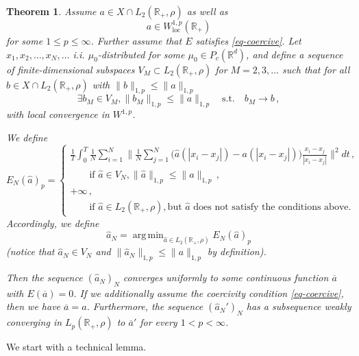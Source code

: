 \documentclass[A4paper,11pt]{article}
\newtheorem{theorem}{Theorem}[section]
\theoremstyle{definition}
\newcommand{\R}{\mathbb{R}}
\DeclareMathOperator{\argmin}{arg\,min}
\begin{document}
\begin{theorem}\label{thm}
	Assume $a\in X\cap L_2(\R_+,\rho)$ as well as
	\begin{equation}\label{eq-a-bounded}
		a\in W^{1,p}_{\text{loc}}(\R_+)
	\end{equation}
	for some $1\leq p\leq\infty$.
	Further assume that $E$ satisfies \eqref{eq-coercive}. Let $x_1,x_2,\ldots,x_N,\ldots$ i.i. $\mu_0$-distributed for
	some $\mu_0\in P_c(\R^d)$, and define a sequence of finite-dimensional subspaces $V_M\subset L_2(\R_+,\rho)$
	for $M=2,3,\ldots$ such that for all $b\in X\cap L_2(\R_+,\rho)$ with $\|b\|_{1,p}\leq\|a\|_{1,p}$
	\begin{equation*}
		\exists b_M\in V_M, \|b_M\|_{1,p}\leq\|a\|_{1,p}\quad\text{s.t.}\quad b_M\rightarrow b\,,
	\end{equation*}
	with local convergence in $W^{1,p}$.
	
	We define
	\begin{equation}\label{eq-error-mod}
		E_N(\widehat a)_p=
		\begin{cases}
			\frac{1}{T}\int_0^T\frac{1}{N}\sum_{i=1}^N\bigl\|\frac{1}{N}\sum_{j=1}^N
				\bigl(\widehat a(|x_i-x_j|)-a(|x_i-x_j|)\bigr)\frac{x_i-x_j}{|x_i-x_j|}\bigr\|^2 dt\,,\\
			\qquad\text{if }\widehat a\in V_N, \|\widehat a\|_{1,p}\leq\|a\|_{1,p}\,,\\
			+\infty\,,\\
			\qquad\text{if }\widehat a \in L_2(\R_+,\rho),
				\text{but $\widehat a$ does not satisfy the conditions above.}
		\end{cases}
	\end{equation}
	Accordingly, we define
	\begin{equation}\label{eq-error-mod-2}
		\widehat a_N=\argmin_{\widehat a\in  L_2(\R_+,\rho)}E_N(\widehat a)_p
	\end{equation}
	(notice that $\widehat a_N\in V_N$ and $\|\widehat a_N\|_{1,p}\leq\|a\|_{1,p}$ by definition).
	
	Then the sequence $(\widehat a_{N})_N$ converges uniformly to some continuous function $\overline a$ with
	$E(\overline a)=0$. If we additionally assume the coercivity condition \eqref{eq-coercive}, then we have
	$\overline a=a$. Furthermore, the sequence $(\widehat a_N')_N$ has a subsequence weakly converging in
	$L_p(\R_+,\rho)$ to $\overline a'$ for every $1<p<\infty$.
\end{theorem}

We start with a technical lemma.
\end{document}
